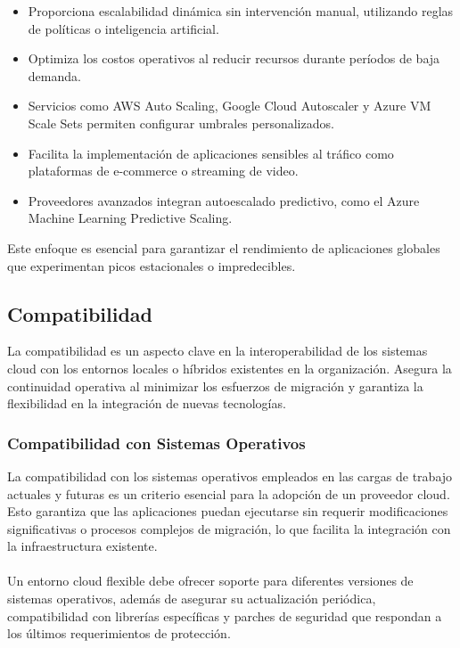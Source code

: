 {                \begin{itemize}
                    \item Proporciona escalabilidad dinámica sin intervención manual, utilizando reglas de políticas o inteligencia artificial.
                    \item Optimiza los costos operativos al reducir recursos durante períodos de baja demanda.
                    \item Servicios como AWS Auto Scaling, Google Cloud Autoscaler y Azure VM Scale Sets permiten configurar umbrales personalizados.
                    \item Facilita la implementación de aplicaciones sensibles al tráfico como plataformas de e-commerce o streaming de video.
                    \item Proveedores avanzados integran autoescalado predictivo, como el Azure Machine Learning Predictive Scaling.
                \end{itemize}
                
                Este enfoque es esencial para garantizar el rendimiento de aplicaciones globales que experimentan picos estacionales o impredecibles.
                
        \subsection{Compatibilidad}
            La compatibilidad es un aspecto clave en la interoperabilidad de los sistemas cloud con los entornos locales o híbridos existentes en la organización. Asegura la continuidad operativa al minimizar los esfuerzos de migración y garantiza la flexibilidad en la integración de nuevas tecnologías.
                
            \subsubsection{Compatibilidad con Sistemas Operativos}
                La compatibilidad con los sistemas operativos empleados en las cargas de trabajo actuales y futuras es un criterio esencial para la adopción de un proveedor cloud. Esto garantiza que las aplicaciones puedan ejecutarse sin requerir modificaciones significativas o procesos complejos de migración, lo que facilita la integración con la infraestructura existente.

                \paragraph{}Un entorno cloud flexible debe ofrecer soporte para diferentes versiones de sistemas operativos, además de asegurar su actualización periódica, compatibilidad con librerías específicas y parches de seguridad que respondan a los últimos requerimientos de protección.

}
